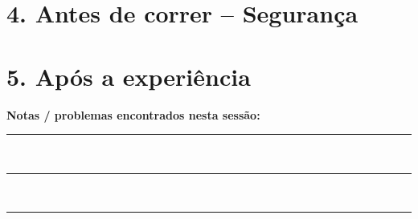 \documentclass[11pt,a4paper]{article}
\begin{document}
\section*{4. Antes de correr -- Seguran\c{c}a}
\begin{checklist}
	\item
	\item
	\item
\end{checklist}

\section*{5. Ap\'os a experi\^encia}
\begin{checklist}
	\item
	\item
	\item
\end{checklist}

\vspace{1.5em}
\noindent\textbf{Notas / problemas encontrados nesta sess\~ao:}\\[0.5em]
\rule{\linewidth}{0.4pt}\\[1em]
\rule{\linewidth}{0.4pt}\\[1em]
\rule{\linewidth}{0.4pt}
\end{document}
